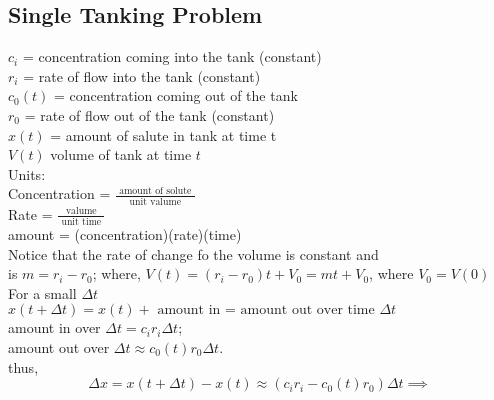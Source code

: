 \subsection*{Single Tanking Problem}
 \( c_i\) = concentration coming into the tank (constant) \\
 \( r_i\) = rate of flow into the tank (constant) \\
 \( c_0(t)\) = concentration coming out of the tank \\
 \( r_0\) = rate of flow out of the tank (constant) \\
 \( x(t) \) = amount of salute in tank at time t \\
 \( V(t)\) volume of tank at time \( t\) \\[5mm] 
 Units: \\
 Concentration = \( \frac{ \text{ amount of solute }}{ \text{ unit
 valume	 }}\) \\ 
 Rate = \( \frac{ \text{ valume }}{ \text{ unit time }}\) \\	 
 amount = (concentration)(rate)(time) \\[5mm]
 Notice that the rate of change fo the volume is constant and  \\
 is \( m = r_i - r_0\); where, \( V(t) = (r_i - r_0)t + V_0 = mt +
 V_0\), where \( V_0 = V(0)\) \\
 For a small \( \Delta t\)\nonumber\\
 \( x(t + \Delta t) = x(t) + \text{ amount in = amount out over time }
 \Delta t\) \\[5mm]
 amount in over \( \Delta t = c_i r_i \Delta t\); \\
 amount out over \( \Delta t \approx c_0(t) r_0 \Delta t\). \\
 thus,  \\
 \[ \Delta x = x(t + \Delta t) - x(t) \approx (c_i r_i - c_0(t)r_0) \Delta
 t \implies \]

